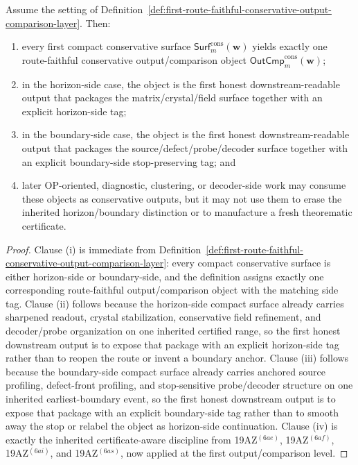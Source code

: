 \begin{proposition}
\label{prop:every-first-compact-conservative-surface-yields-exactly-one-route-faithful-conservative-output-comparison-object}
Assume the setting of Definition~\ref{def:first-route-faithful-conservative-output-comparison-layer}. Then:
\begin{enumerate}[label=(\roman*)]
 \item every first compact conservative surface \(\mathsf{Surf}^{\mathrm{cons}}_{m}(\mathbf w)\) yields exactly one route-faithful conservative output/comparison object \(\mathsf{OutCmp}^{\mathrm{cons}}_{m}(\mathbf w)\);
 \item in the horizon-side case, the object is the first honest downstream-readable output that packages the matrix/crystal/field surface together with an explicit horizon-side tag;
 \item in the boundary-side case, the object is the first honest downstream-readable output that packages the source/defect/probe/decoder surface together with an explicit boundary-side stop-preserving tag; and
 \item later OP-oriented, diagnostic, clustering, or decoder-side work may consume these objects as conservative outputs, but it may not use them to erase the inherited horizon/boundary distinction or to manufacture a fresh theorematic certificate.
\end{enumerate}
\end{proposition}

\begin{proof}
Clause (i) is immediate from Definition~\ref{def:first-route-faithful-conservative-output-comparison-layer}: every compact conservative surface is either horizon-side or boundary-side, and the definition assigns exactly one corresponding route-faithful output/comparison object with the matching side tag. Clause (ii) follows because the horizon-side compact surface already carries sharpened readout, crystal stabilization, conservative field refinement, and decoder/probe organization on one inherited certified range, so the first honest downstream output is to expose that package with an explicit horizon-side tag rather than to reopen the route or invent a boundary anchor. Clause (iii) follows because the boundary-side compact surface already carries anchored source profiling, defect-front profiling, and stop-sensitive probe/decoder structure on one inherited earliest-boundary event, so the first honest downstream output is to expose that package with an explicit boundary-side tag rather than to smooth away the stop or relabel the object as horizon-side continuation. Clause (iv) is exactly the inherited certificate-aware discipline from 19AZ$^{(6ae)}$, 19AZ$^{(6af)}$, 19AZ$^{(6ai)}$, and 19AZ$^{(6as)}$, now applied at the first output/comparison level.
\end{proof}


